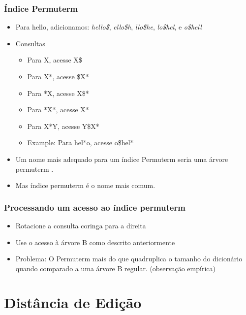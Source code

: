 \documentclass[compress]{beamer}
\def\term#1{{\sc #1}}   %
\begin{document}
\begin{frame}
\frametitle{Índice Permuterm }
\begin{itemize}[<+->]
\item Para \term{hello}, adicionamos:
\emph{hello\$},
\emph{ello\$h},
\emph{llo\$he},
\emph{lo\$hel}, e
\emph{o\$hell}
\item Consultas
\begin{itemize}[<+->]
\item Para X, acesse X\$
\item Para X*, acesse \$X*
\item Para *X, acesse X\$*
\item Para *X*, acesse X*
\item Para X*Y, acesse Y\$X*
\item Example: Para hel*o, acesse o\$hel*
\end{itemize}
\item Um nome mais adequado para um índice Permuterm  seria uma árvore 
permuterm .
\item Mas índice permuterm é o nome mais comum.
\end{itemize}
\end{frame}

\begin{frame}
\frametitle{Processando um acesso ao índice permuterm }
\begin{itemize}[<+->]
\item Rotacione a consulta coringa para a direita
\item Use o acesso à árvore B como descrito anteriormente
\item Problema: O Permuterm mais do que {\color{blue} quadruplica} 
o tamanho do dicionário quando comparado a uma árvore B regular. 
(observação empírica)
\end{itemize}
\end{frame}

\section{Distância de Edição}
\end{document}
